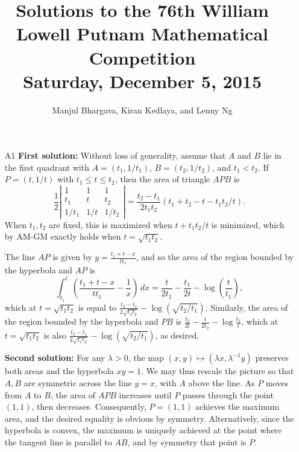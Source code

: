 \documentclass[amssymb,twocolumn,pra,10pt,aps]{revtex4-1}
\begin{document}
\title{Solutions to the 76th William Lowell Putnam Mathematical Competition \\
    Saturday, December 5, 2015}
\author{Manjul Bhargava, Kiran Kedlaya, and Lenny Ng}
\noaffiliation
\maketitle

\begin{itemize}
\item[A1]
\textbf{First solution:}
Without loss of generality, assume that $A$ and $B$ lie in the first quadrant with $A = (t_1,1/t_1)$, $B = (t_2,1/t_2)$, and $t_1<t_2$. If $P = (t,1/t)$ with $t_1 \leq t \leq t_2$, then the area of triangle $APB$ is
\[
\frac{1}{2} \left| \begin{matrix} 1 & 1 & 1 \\ t_1 & t & t_2 \\ 1/t_1 & 1/t & 1/t_2 \end{matrix} \right| = \frac{t_2-t_1}{2t_1t_2} (t_1+t_2-t-t_1t_2/t).
\]
When $t_1,t_2$ are fixed, this is maximized when $t+t_1t_2/t$ is minimized, which by AM-GM exactly holds when $t = \sqrt{t_1t_2}$.

The line $AP$ is given by $y = \frac{t_1+t-x}{tt_1}$, and so the area of the region bounded by the hyperbola and $AP$ is
\[
\int_{t_1}^t \left( \frac{t_1+t-x}{tt_1} - \frac{1}{x} \right) \,dx = \frac{t}{2t_1}-\frac{t_1}{2t}-\log \left(\frac{t}{t_1} \right),
\]
which at $t = \sqrt{t_1t_2}$ is equal to $\frac{t_2-t_1}{2\sqrt{t_1t_2}} - \log(\sqrt{t_2/t_1})$. Similarly, the area of the region bounded by the hyperbola and $PB$ is $\frac{t_2}{2t}-\frac{t}{2t_2}-\log \frac{t_2}{t}$, which at $t = \sqrt{t_1t_2}$ is also $\frac{t_2-t_1}{2\sqrt{t_1t_2}} - \log(\sqrt{t_2/t_1})$, as desired.

\noindent
\textbf{Second solution:}
For any $\lambda > 0$, the map $(x,y) \mapsto (\lambda x, \lambda^{-1} y)$ preserves both areas and the hyperbola $xy=1$. We may thus rescale the picture so that
$A,B$ are symmetric across the line $y=x$, with $A$ above the line. As $P$ moves from $A$ to $B$, the area of $APB$ increases until $P$ passes through the point $(1,1)$, then decreases. Consequently, $P = (1,1)$ achieves the maximum area, and the desired equality is obvious by symmetry.
Alternatively, since the hyperbola is convex, the maximum is uniquely achieved at the point where the tangent line is parallel to $AB$, and by symmetry that point is $P$.


\end{itemize}
\end{document}
